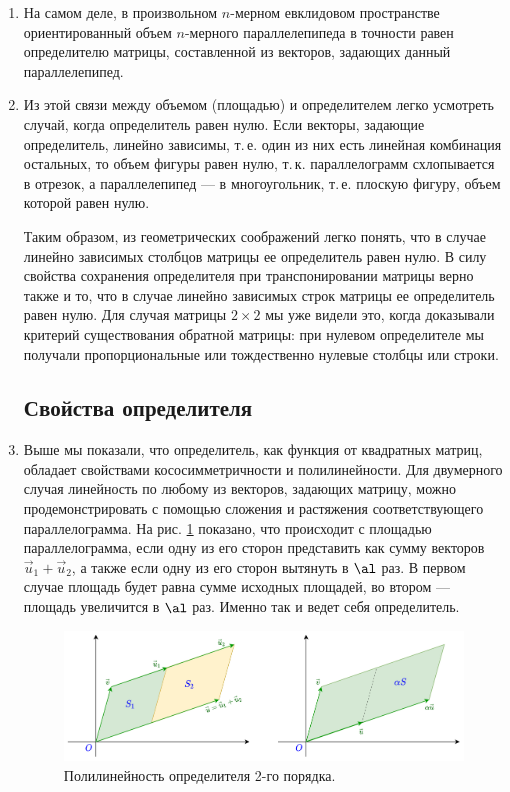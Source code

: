 \begin{enumerate}
\item На самом деле, в произвольном $n$-мерном евклидовом пространстве ориентированный объем $n$-мерного параллелепипеда в точности равен определителю матрицы, составленной из векторов, задающих данный параллелепипед.

\item Из этой связи между объемом (площадью) и определителем легко усмотреть случай, когда определитель равен нулю. Если векторы, задающие определитель, линейно зависимы, т.\,е. один из них есть линейная комбинация остальных, то объем фигуры равен нулю, т.\,к. параллелограмм схлопывается в отрезок, а параллелепипед --- в многоугольник, т.\,е. плоскую фигуру, объем которой равен нулю.

Таким образом, из геометрических соображений легко понять, что в случае линейно зависимых столбцов матрицы ее определитель равен нулю. В силу свойства сохранения определителя при транспонировании матрицы верно также и то, что в случае линейно зависимых строк матрицы ее определитель равен нулю.
Для случая матрицы $2\times 2$ мы уже видели это, когда доказывали критерий существования обратной матрицы: при нулевом определителе мы получали пропорциональные или тождественно нулевые столбцы или строки.


\subsection*{Свойства определителя}

\item Выше мы показали, что определитель, как функция от квадратных матриц, обладает свойствами кососимметричности и полилинейности. Для двумерного случая линейность по любому из векторов, задающих матрицу, можно продемонстрировать с помощью сложения и растяжения соответствующего параллелограмма. На рис. \ref{LinParalel} показано, что происходит с площадью параллелограмма, если одну из его сторон представить как сумму векторов $\vec u_1+\vec u_2$, а также если одну из его сторон вытянуть в $\al$ раз. В первом случае площадь будет равна сумме исходных площадей, во втором --- площадь увеличится в $\al$ раз. Именно так и ведет себя определитель.

\begin{figure}[hbt!]
\begin{center}
\includegraphics[scale=0.2]{LinParalel.png}
\end{center}\caption{Полилинейность определителя 2-го порядка.}\label{LinParalel}
\end{figure}



\end{enumerate}
